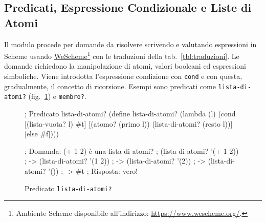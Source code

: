 \documentclass[withtimes]{easychair}
\begin{document}
%   
%
%   


\subsection{Predicati, Espressione Condizionale e Liste di Atomi}\label{atomi-operatori-predicati-e-liste-di-atomi}

Il modulo procede per domande da risolvere scrivendo e valutando espressioni in Scheme usando \href{https://www.wescheme.org/}{WeScheme}\footnote{Ambiente Scheme disponibile all'indirizzo: \url{https://www.wescheme.org/}.} con le traduzioni della tab.~\ref{tbl:traduzioni}. Le domande richiedono la manipolazione di atomi, valori booleani ed espressioni simboliche. Viene introdotta l'espressione condizione con \texttt{cond} e con questa, gradualmente, il concetto di ricorsione. Esempi sono predicati come \texttt{lista-di-atomi?} (fig.~\ref{fig:lista-di-atomi?}) e \texttt{membro?}.

\begin{figure}[ht]
  \centering
  \begin{pygmented}[lang=scheme]
; Predicato lista-di-atomi?
(define lista-di-atomi?
  (lambda (l)
    (cond
      [(lista-vuota? l) #t]
      [(atomo? (primo l)) (lista-di-atomi? (resto l))]
      [else #f])))

; Domanda: (+ 1 2) è una lista di atomi?
; (lista-di-atomi? '(+ 1 2))
; -> (lista-di-atomi? '(1 2))
; -> (lista-di-atomi? '(2))
; -> (lista-di-atomi? '())
; -> #t
; Risposta: vero!
  \end{pygmented}
  \caption{Predicato \texttt{lista-di-atomi?}}
  \label{fig:lista-di-atomi?}
\end{figure}

%
%
\end{document}
